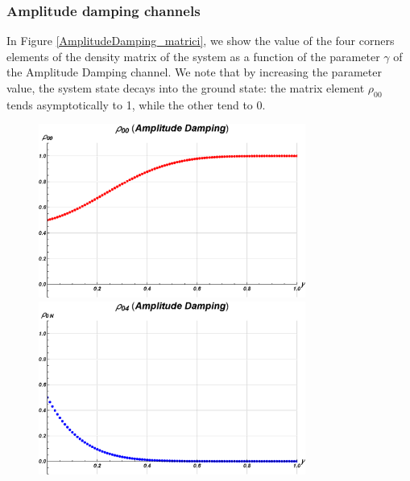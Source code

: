 
\subsubsection{Amplitude damping channels}

In Figure \ref{AmplitudeDamping_matrici}, we show the value of the four corners elements of the density matrix of the system as a function of the parameter $\gamma$ of the Amplitude Damping channel. We note that by increasing the parameter value, the system state decays into the ground state: the matrix element $\rho_{00}$ tends asymptotically to 1, while the other tend to 0.



\begin{figure}[h!]
\begin{minipage}[c]{0.5\linewidth}
\hspace{1cm}
\centering \includegraphics[width=0.78\textwidth]{./chapter3/Cirq_nuovo/decoerenza/amp_00.eps}
\end{minipage}
\begin{minipage}[]{0.5\linewidth}
\centering \includegraphics[width=0.78\textwidth]{./chapter3/Cirq_nuovo/decoerenza/amp_0N.eps}

\end{minipage}
\end{figure}
